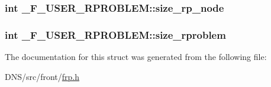 \subsubsection[{\texorpdfstring{size\+\_\+rp\+\_\+node}{size_rp_node}}]{\setlength{\rightskip}{0pt plus 5cm}int \+\_\+\+F\+\_\+\+U\+S\+E\+R\+\_\+\+R\+P\+R\+O\+B\+L\+E\+M\+::size\+\_\+rp\+\_\+node}\hypertarget{struct___f___u_s_e_r___r_p_r_o_b_l_e_m_afd2b24532e9baccaeda4a297e0ae63c3}{}\label{struct___f___u_s_e_r___r_p_r_o_b_l_e_m_afd2b24532e9baccaeda4a297e0ae63c3}
\subsubsection[{\texorpdfstring{size\+\_\+rproblem}{size_rproblem}}]{\setlength{\rightskip}{0pt plus 5cm}int \+\_\+\+F\+\_\+\+U\+S\+E\+R\+\_\+\+R\+P\+R\+O\+B\+L\+E\+M\+::size\+\_\+rproblem}\hypertarget{struct___f___u_s_e_r___r_p_r_o_b_l_e_m_a7fc632d2b1dc9b15044d4e63bfa0df50}{}\label{struct___f___u_s_e_r___r_p_r_o_b_l_e_m_a7fc632d2b1dc9b15044d4e63bfa0df50}


The documentation for this struct was generated from the following file\+:\begin{DoxyCompactItemize}
\item 
D\+N\+S/src/front/\hyperlink{frp_8h}{frp.\+h}\end{DoxyCompactItemize}
